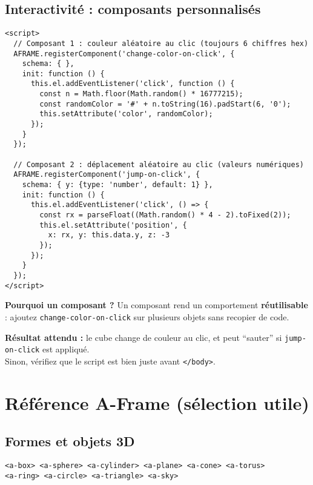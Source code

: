 \documentclass[12pt]{article}
\begin{document}
\subsection{Interactivité : composants personnalisés}
\begin{verbatim}
<script>
  // Composant 1 : couleur aléatoire au clic (toujours 6 chiffres hex)
  AFRAME.registerComponent('change-color-on-click', {
    schema: { },
    init: function () {
      this.el.addEventListener('click', function () {
        const n = Math.floor(Math.random() * 16777215);
        const randomColor = '#' + n.toString(16).padStart(6, '0');
        this.setAttribute('color', randomColor);
      });
    }
  });

  // Composant 2 : déplacement aléatoire au clic (valeurs numériques)
  AFRAME.registerComponent('jump-on-click', {
    schema: { y: {type: 'number', default: 1} },
    init: function () {
      this.el.addEventListener('click', () => {
        const rx = parseFloat((Math.random() * 4 - 2).toFixed(2));
        this.el.setAttribute('position', {
          x: rx, y: this.data.y, z: -3
        });
      });
    }
  });
</script>
\end{verbatim}

\begin{concept}
\textbf{Pourquoi un composant ?} Un composant rend un comportement \textbf{réutilisable} : ajoutez \texttt{change-color-on-click} sur plusieurs objets sans recopier de code.
\end{concept}

\begin{checkpoint}
\textbf{Résultat attendu :} le cube change de couleur au clic, et peut “sauter” si \texttt{jump-on-click} est appliqué.\\
Sinon, vérifiez que le script est bien juste avant \texttt{</body>}.
\end{checkpoint}

\section{Référence A-Frame (sélection utile)}
\subsection{Formes et objets 3D}
\begin{verbatim}
<a-box> <a-sphere> <a-cylinder> <a-plane> <a-cone> <a-torus>
<a-ring> <a-circle> <a-triangle> <a-sky>
\end{verbatim}
\end{document}
